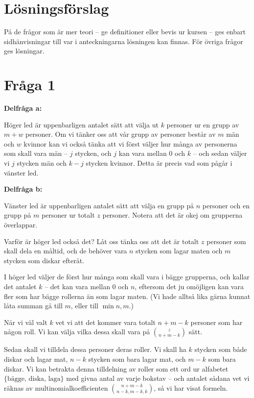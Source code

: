 \documentclass[nobib]{tufte-handout}
\begin{document}
\pagebreak

\section{Lösningsförslag}

På de frågor som är mer teori -- ge definitioner eller bevis ur kursen -- ges enbart sidhänvisningar till var i anteckningarna lösningen kan finnas. För övriga frågor ges lösningar.

\section{Fråga 1}

\noindent\textbf{Delfråga a:}

Höger led är uppenbarligen antalet sätt att välja ut $k$ personer ur en grupp av $m + w$ personer. Om vi tänker oss att vår grupp av personer består av $m$ män och $w$ kvinnor kan vi också tänka att vi först väljer hur många av personerna som skall vara män -- $j$ stycken, och $j$ kan vara mellan $0$ och $k$ -- och sedan väljer vi $j$ stycken män och $k-j$ stycken kvinnor. Detta är precis vad som pågår i vänster led.

\noindent\textbf{Delfråga b:}

Vänster led är uppenbarligen antalet sätt att välja en grupp på $n$ personer och en grupp på $m$ personer ur totalt $z$ personer. Notera att det är okej om grupperna överlappar.

Varför är höger led också det? Låt oss tänka oss att det är totalt $z$ personer som skall dela en måltid, och de behöver vara $n$ stycken som lagar maten och $m$ stycken som diskar efteråt.

I höger led väljer de först hur många som skall vara i bägge grupperna, och kallar det antalet $k$ -- det kan vara mellan $0$ och $n$, eftersom det ju omöjligen kan vara fler som har bägge rollerna än som lagar maten. (Vi hade alltså lika gärna kunnat låta summan gå till $m$, eller till $\min n, m$.)

När vi väl valt $k$ vet vi att det kommer vara totalt $n+m-k$ personer som har någon roll. Vi kan välja vilka dessa skall vara på $\binom{z}{n+m-k}$ sätt.

Sedan skall vi tilldela dessa personer deras roller. Vi skall ha $k$ stycken som både diskar och lagar mat, $n-k$ stycken som bara lagar mat, och $m-k$ som bara diskar. Vi kan betrakta denna tilldelning av roller som ett ord ur alfabetet $\{\text{bägge, diska, laga}\}$ med givna antal av varje bokstav -- och antalet sådana vet vi räknas av multinomialkoefficienten $\binom{n+m-k}{n-k,m-k,k}$, så vi har visat formeln.
\end{document}
